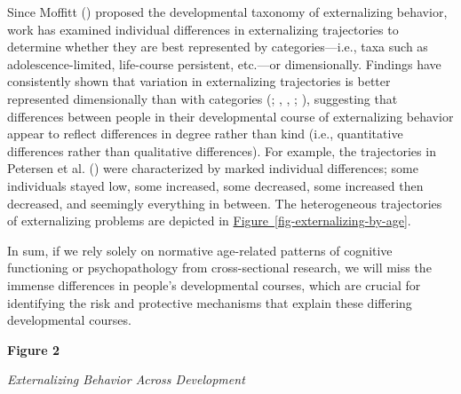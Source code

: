 \documentclass[
  american,
  letterpaper,
  12pt]{article}
\newcommand{\apafloattitle}[1]{%
  {\par\noindent\bfseries #1\par\nopagebreak}}
\newcommand{\apafloatcaption}[1]{%
  {\par\noindent\itshape\interlinepenalty10000 #1\par\nopagebreak}}
\newlength{\apatablekeepdepth}
\newcommand{\apatablekeep}{%
  \par\setlength{\apatablekeepdepth}{\prevdepth}%
  \setbox\apatablekeepbox\vbox\bgroup\prevdepth\apatablekeepdepth}
\newcommand{\apafigureskip}{%
  \par\ifdim\prevdepth>0pt\vskip-\prevdepth\prevdepth=0pt\fi
  \vspace{1.2em}}
\begin{document}
Since Moffitt () proposed the
developmental taxonomy of externalizing behavior, work has examined
individual differences in externalizing trajectories to determine
whether they are best represented by categories---i.e., taxa such as
adolescence-limited, life-course persistent, etc.---or dimensionally.
Findings have consistently shown that variation in externalizing
trajectories is better represented dimensionally than with categories
(;
,
, ;
), suggesting that
differences between people in their developmental course of
externalizing behavior appear to reflect differences in degree rather
than kind (i.e., quantitative differences rather than qualitative
differences). For example, the trajectories in Petersen et al.
() were characterized by marked
individual differences; some individuals stayed low, some increased,
some decreased, some increased then decreased, and seemingly everything
in between. The heterogeneous trajectories of externalizing problems are
depicted in
\hyperref[fig-externalizing-by-age]{Figure~\ref*{fig-externalizing-by-age}}.

In sum, if we rely solely on normative age-related patterns of cognitive
functioning or psychopathology from cross-sectional research, we will
miss the immense differences in people's developmental courses, which
are crucial for identifying the risk and protective mechanisms that
explain these differing developmental courses.

\par\addvspace{\baselineskip}\begingroup

\setlength{\parindent}{0pt}

\captionsetup{type=figure}

\apatablekeep

\setcounter{figure}{1}

\def\theHfigure{\arabic{figure}}%
%
\makeatletter\def\@currentlabel{2}\makeatother%
\label{fig-externalizing-by-age}

\apafloattitle{Figure 2}

\apafloatcaption{Externalizing Behavior Across Development}

\apafigureskip

\end{document}
